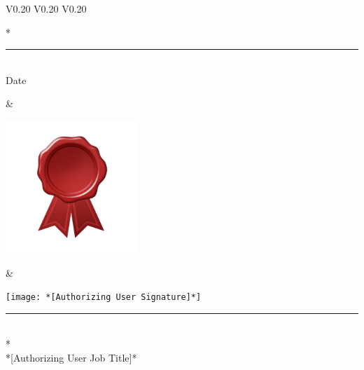 \documentclass{article}
\begin{document}
\vspace{12pt}

\setlength{\tabcolsep}{12pt}
\begin{table}[h]
  \centering
  \begin{tabular} {V{0.20\paperwidth} V{0.20\paperwidth} V{0.20\paperwidth} }       
    \vspace{0pt}\parbox[b][1cm][b]{5cm}{\huge\selectfont {}* \\
    \rule{5cm}{0.4pt} \\
    \normalsize\selectfont \centering Date \\
    \phantom{Date}}                                                            &   
    \vspace{0pt}\parbox[b][1cm][c]{5cm}{\includegraphics[width=5cm]{images/redribbon}} &   
    \vspace{0pt}\parbox[b][1cm][b]{5cm}{\texttt{[image: *[Authorizing User Signature]*]} \\
    \rule{5cm}{0.4pt} \\
    \normalsize\selectfont {}* \\
    *[Authorizing User Job Title]*}
  \end{tabular}
\end{table}
\end{document}
